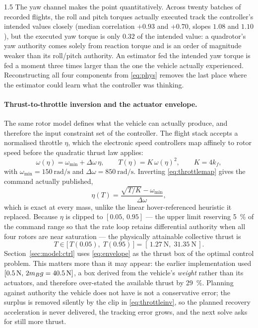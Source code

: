 \begin{spacing}{1.5}
The yaw channel makes the point quantitatively. Across twenty batches of recorded
flights, the roll and pitch torques actually executed track the controller's
intended values closely (median correlation $+0.93$ and $+0.70$, slopes $1.08$
and $1.10$), but the executed yaw torque is only $0.32$ of the intended value: a
quadrotor's yaw authority comes solely from reaction torque and is an order of
magnitude weaker than its roll/pitch authority. An estimator fed the intended yaw
torque is fed a moment three times larger than the one the vehicle actually
experienced. Reconstructing all four components from \eqref{eq:phys} removes the
last place where the estimator could learn what the controller was thinking.

\paragraph{Thrust-to-throttle inversion and the actuator envelope.} The same
rotor model defines what the vehicle can actually produce, and therefore the
input constraint set of the controller. The flight stack accepts a normalised
throttle $\eta$, which the electronic speed controllers map affinely to rotor
speed before the quadratic thrust law applies:
\begin{equation}
\omega(\eta) = \omega_{\min} + \Delta\omega\,\eta,
\qquad
T(\eta) = K\,\omega(\eta)^2,
\qquad K = 4k_f ,
\label{eq:throttlemap}
\end{equation}
with $\omega_{\min}=\SI{150}{\radian\per\second}$ and
$\Delta\omega=\SI{850}{\radian\per\second}$. Inverting \eqref{eq:throttlemap}
gives the command actually published,
\begin{equation}
\eta(T) = \frac{\sqrt{T/K}-\omega_{\min}}{\Delta\omega},
\label{eq:throttleinv}
\end{equation}
which is exact at every mass, unlike the linear hover-referenced heuristic it
replaced. Because $\eta$ is clipped to $[0.05,\,0.95]$ --- the upper limit
reserving \SI{5}{\percent} of the command range so that the rate loop retains
differential authority when all four rotors are near saturation --- the
physically attainable collective thrust is
\begin{equation}
T \in \bigl[\,T(0.05),\; T(0.95)\,\bigr] = [\,\SI{1.27}{\newton},\; \SI{31.35}{\newton}\,].
\label{eq:envelope}
\end{equation}
Section~\ref{sec:model:ctrl} uses \eqref{eq:envelope} as the thrust box of the
optimal control problem. This matters more than it may appear: the earlier
implementation used $[\SI{0.5}{\newton},\,2m_B g=\SI{40.5}{\newton}]$, a box
derived from the vehicle's \emph{weight} rather than its actuators, and therefore
over-stated the available thrust by \SI{29}{\percent}. Planning against authority
the vehicle does not have is not a conservative error; the surplus is removed
silently by the clip in \eqref{eq:throttleinv}, so the planned recovery
acceleration is never delivered, the tracking error grows, and the next solve
asks for still more thrust.


\end{spacing}
